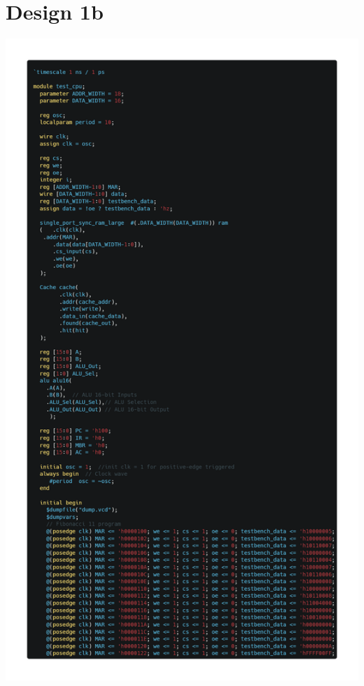 \documentclass[12pt]{article}
\begin{document}
\section{Design 1b}
\begin{center}
    \includegraphics[scale=0.35]{images/b_1.png}
\end{center}
\end{document}
